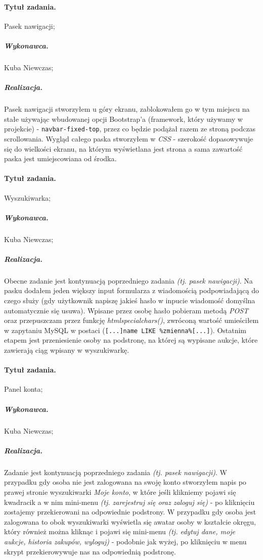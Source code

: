 \documentclass[a4paper]{article}
\begin{document}
	\paragraph{Tytuł zadania.} Pasek nawigacji;
	\subparagraph{Wykonawca.} Kuba Niewczas;
	\subparagraph{Realizacja.} Pasek nawigacji stworzyłem u góry ekranu, zablokowałem go w tym miejscu na stałe używając wbudowanej opcji Bootstrap'a (framework, który używamy w projekcie) - \verb|navbar-fixed-top|, przez co będzie podążał razem ze stroną podczas scrollowania. Wygląd całego paska stworzyłem w \emph{CSS} - szerokość dopasowywuje się do wielkości ekranu, na którym wyświetlana jest strona a sama zawartość paska jest umiejscowiana od środka.
	
	\paragraph{Tytuł zadania.} Wyszukiwarka;
	\subparagraph{Wykonawca.} Kuba Niewczas;
	\subparagraph{Realizacja.} Obecne zadanie jest kontynuacją poprzedniego zadania \emph{(tj. pasek nawigacji)}. Na pasku dodałem jeden większy input formularza z wiadomością podpowiadającą do czego służy (gdy użytkownik napiszę jakieś hasło w inpucie wiadomość domyślna automatycznie się usuwa). Wpisane przez osobę hasło pobieram metodą \emph{POST} oraz przepuszczam przez funkcję \emph{htmlspecialchars()}, zwróconą wartość umieściłem w zapytaniu MySQL w postaci (\verb|[...]name LIKE %zmienna%[...]|). Ostatnim etapem jest przeniesienie osoby na podstronę, na której są wypisane aukcje, które zawierają ciąg wpisany w wyszukiwarkę.
	
	\paragraph{Tytuł zadania.} Panel konta;
	\subparagraph{Wykonawca.} Kuba Niewczas;
	\subparagraph{Realizacja.} Zadanie jest kontynuacją poprzedniego zadania \emph{(tj. pasek nawigacji)}. W przypadku gdy osoba nie jest zalogowana na swoję konto stworzyłem napis po prawej stronie wyszukiwarki \emph{Moje konto}, w które jeśli klikniemy pojawi się kwadracik a w nim mini-menu \emph{(tj. zarejestruj się oraz zaloguj się)} - po kliknięciu zostajemy przekierowani na odpowiednie podstrony. W przypadku gdy osoba jest zalogowana to obok wyszukiwarki wyświetla się awatar osoby w kształcie okręgu, który również można kliknąc i pojawi się mini-menu \emph{(tj. edytuj dane, moje aukcje, historia zakupów, wyloguj)} - podobnie jak wyżej, po kliknięciu w menu skrypt przekierowywuje nas na odpowiednią podstronę.
	
\end{document}
